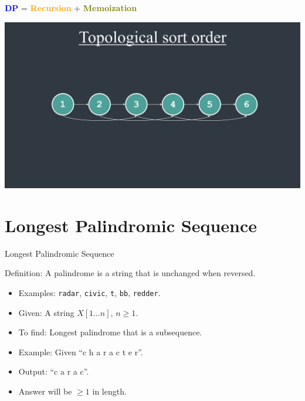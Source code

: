 \documentclass[aspectratio=169]{beamer}
\begin{document}
\begin{frame}{ }
    \centering
    \LARGE
    \textcolor{blue}{\textbf{DP}} = \textcolor{orange}{\textbf{Recursion}} + \textcolor{olive}{\textbf{Memoization}}
\end{frame}


\begin{frame}{ }
    \centering
    \includegraphics[width=\textwidth]{figures/topo.png}
\end{frame}

\section{Longest Palindromic Sequence}

\begin{frame}{Longest Palindromic Sequence}
    \begin{exampleblock}{Definition:}
        A palindrome is a string that is unchanged when reversed.
    \end{exampleblock}
    \begin{itemize}
     \item Examples: \texttt{radar}, \texttt{civic}, \texttt{t}, \texttt{bb}, \texttt{redder}.
     \item Given: A string $X[1 \ldots n]$, $n \geq 1$.
     \item To ﬁnd: Longest palindrome that is a subsequence.
     \item Example: Given ``c h a r a c t e r''.
     \item Output: ``c a r a c''.
     \item Answer will be $\geq 1$ in length.
    \end{itemize}
\end{frame}
\end{document}
